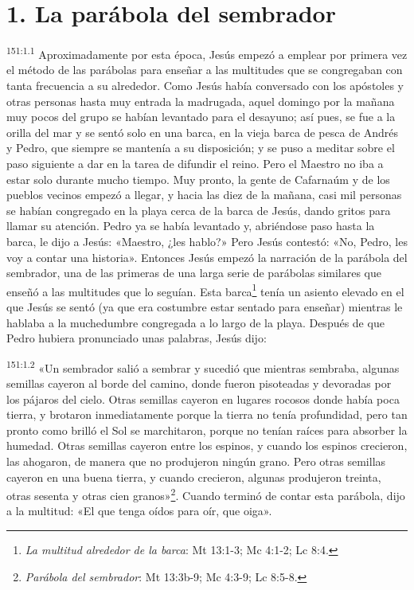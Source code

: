 \section*{1. La parábola del sembrador}
\par
\textsuperscript{151:1.1} Aproximadamente por esta época, Jesús empezó a emplear por primera vez el método de las parábolas para enseñar a las multitudes que se congregaban con tanta frecuencia a su alrededor. Como Jesús había conversado con los apóstoles y otras personas hasta muy entrada la madrugada, aquel domingo por la mañana muy pocos del grupo se habían levantado para el desayuno; así pues, se fue a la orilla del mar y se sentó solo en una barca, en la vieja barca de pesca de Andrés y Pedro, que siempre se mantenía a su disposición; y se puso a meditar sobre el paso siguiente a dar en la tarea de difundir el reino. Pero el Maestro no iba a estar solo durante mucho tiempo. Muy pronto, la gente de Cafarnaúm y de los pueblos vecinos empezó a llegar, y hacia las diez de la mañana, casi mil personas se habían congregado en la playa cerca de la barca de Jesús, dando gritos para llamar su atención. Pedro ya se había levantado y, abriéndose paso hasta la barca, le dijo a Jesús: «Maestro, ¿les hablo?» Pero Jesús contestó: «No, Pedro, les voy a contar una historia». Entonces Jesús empezó la narración de la parábola del sembrador, una de las primeras de una larga serie de parábolas similares que enseñó a las multitudes que lo seguían. Esta barca\footnote{\textit{La multitud alrededor de la barca}: Mt 13:1-3; Mc 4:1-2; Lc 8:4.} tenía un asiento elevado en el que Jesús se sentó (ya que era costumbre estar sentado para enseñar) mientras le hablaba a la muchedumbre congregada a lo largo de la playa. Después de que Pedro hubiera pronunciado unas palabras, Jesús dijo:

\par
\textsuperscript{151:1.2} «Un sembrador salió a sembrar y sucedió que mientras sembraba, algunas semillas cayeron al borde del camino, donde fueron pisoteadas y devoradas por los pájaros del cielo. Otras semillas cayeron en lugares rocosos donde había poca tierra, y brotaron inmediatamente porque la tierra no tenía profundidad, pero tan pronto como brilló el Sol se marchitaron, porque no tenían raíces para absorber la humedad. Otras semillas cayeron entre los espinos, y cuando los espinos crecieron, las ahogaron, de manera que no produjeron ningún grano. Pero otras semillas cayeron en una buena tierra, y cuando crecieron, algunas produjeron treinta, otras sesenta y otras cien granos»\footnote{\textit{Parábola del sembrador}: Mt 13:3b-9; Mc 4:3-9; Lc 8:5-8.}. Cuando terminó de contar esta parábola, dijo a la multitud: «El que tenga oídos para oír, que oiga».

